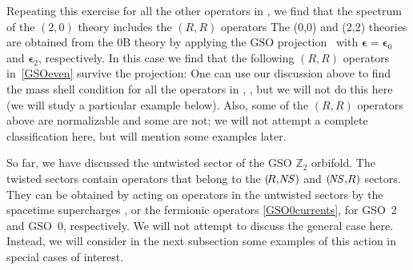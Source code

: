 \documentclass[12pt]{article}
\def\epsilonb{{\boldsymbol\epsilon}}
\def\NS{{\it \!NS}}
\newcommand{\bZ}{{\mathbb Z}}
\numberwithin{equation}{section}
\begin{document}
Repeating this exercise for all the other operators in \GSOeven, we find that the spectrum of the $(2,0)$ theory includes the $(\!R,\!R)$ operators 
The (0,0) and (2,2) theories are obtained from the 0B theory by applying the GSO projection \chiralGSO\ with $\epsilonb=\epsilonb_0$ and $\epsilonb_2$, respectively. In this case we find that the following $(\!R,\!R)$ operators in~\eqref{GSOeven} survive the projection:
One can use our discussion above to find the mass shell condition for all the operators in \RRIIA, \RRIIB, but we will not do this here (we will study a particular example below). Also, some of the $(\!R,\!R)$ operators above are normalizable and some are not; we will not attempt a complete classification here, but will mention some examples later. 

So far, we have discussed the untwisted sector of the GSO $\bZ_2$ orbifold. The twisted sectors contain operators that belong to the $(\!R,\NS)$ and $(\NS,\!R)$ sectors. They can be obtained by acting on operators in the untwisted sectors by the spacetime supercharges \susyops, or the fermionic operators \eqref{GSO0currents}, for GSO~2 and GSO~0, respectively. We will not attempt to discuss the general case here. Instead, we will consider in the next subsection some examples of this action in special cases of interest.
\end{document}
